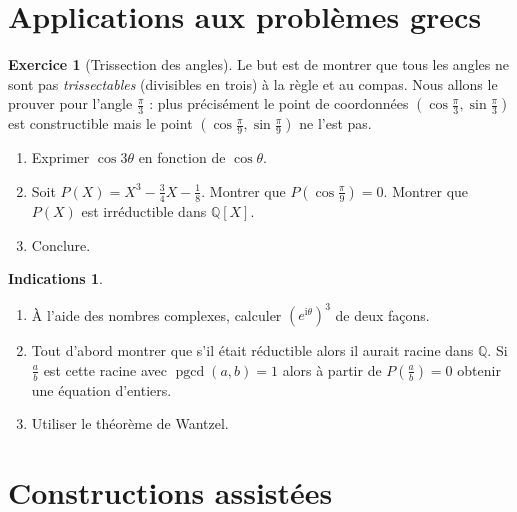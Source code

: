 \documentclass[11pt,a4paper]{article}
\newcommand{\Qq}{\mathbb{Q}} \newcommand{\Q}{\mathbb{Q}}
\newcommand{\pgcd}{\mathop{\mathrm{pgcd}}\nolimits}
\theoremstyle{definition}
\newtheorem{exo}{Exercice}
\newtheorem{ind}{Indications}
\newcommand{\exercice}[1]{} \newcommand{\finexercice}{}
\newcommand{\enonce}{\begin{exo}} \newcommand{\finenonce}{\end{exo}}
\newcommand{\indication}{\begin{ind}} \newcommand{\finindication}{\end{ind}}
\newcommand{\ii}{\mathrm{i}}
\begin{document}
\section{Applications aux problèmes grecs}



\exercice{}
\enonce[Trissection des angles]
Le but est de montrer que tous les angles ne sont pas \emph{trissectables} (divisibles en trois) à la règle et au compas.
Nous allons le prouver pour l'angle $\frac \pi 3$ : plus précisément le point de coordonnées 
$(\cos \frac \pi 3,\sin \frac \pi 3)$ est constructible mais le point $(\cos \frac \pi 9,\sin \frac \pi 9)$ ne l'est pas.
\begin{enumerate}
 \item Exprimer $\cos 3\theta$ en fonction de $\cos \theta$.
 \item Soit $P(X) = X^3-\frac34X-\frac 18$. Montrer que $P(\cos \frac\pi 9) = 0$.
 Montrer que $P(X)$ est irréductible dans $\Qq[X]$.
 \item Conclure.
\end{enumerate}
\finenonce

\indication
\begin{enumerate}
  \item \`A l'aide des nombres complexes, calculer $(e^{\ii\theta})^3$ de deux façons.
  \item Tout d'abord montrer que s'il était réductible alors il aurait racine dans $\Qq$.
Si $\frac ab$ est cette racine avec $\pgcd(a,b)=1$ alors à partir de $P(\frac ab)=0$ obtenir une équation d'entiers.
  \item Utiliser le théorème de Wantzel.
\end{enumerate}
\finindication

\finexercice



\section{Constructions assistées}
\end{document}
